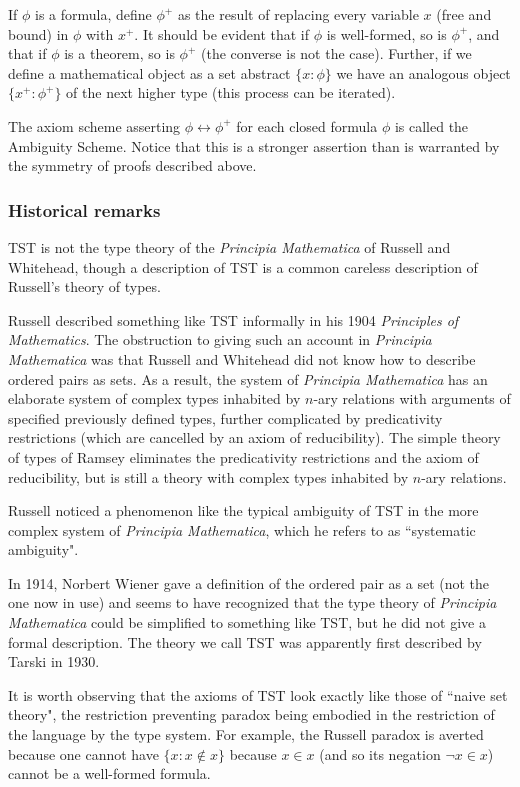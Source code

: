 \documentclass[12pt]{article}
\begin{document}
If $\phi$ is a formula, define $\phi^+$ as the result of replacing every variable $x$ (free and bound) in $\phi$ with $x^+$.  It should be evident that if $\phi$ is well-formed, so is $\phi^+$,
and that if $\phi$ is a theorem, so is $\phi^+$ (the converse is not the case).  Further, if we define a mathematical object as a set abstract $\{x:\phi\}$ we have an analogous
object $\{x^+:\phi^+\}$ of the next higher type (this process can be iterated).

The axiom scheme asserting $\phi \leftrightarrow \phi^+$ for each closed formula $\phi$ is called the Ambiguity Scheme.   Notice that this is a stronger assertion than is warranted by the symmetry of proofs described above.

\subsubsection{Historical remarks}

TST is not the type theory of the {\em Principia Mathematica\/} of Russell and Whitehead, though a description of TST is a common careless description of Russell's theory of types.

Russell described something like TST informally in his 1904 {\em Principles of Mathematics\/}.  The obstruction to giving such an account in {\em Principia Mathematica\/} was that
Russell and Whitehead did not know how to describe ordered pairs as sets.  As a result, the system of {\em Principia Mathematica\/} has an elaborate system of  complex
types inhabited by $n$-ary relations with arguments of specified previously defined types, further complicated by predicativity restrictions (which are cancelled by an axiom of reducibility).
The simple theory of types of Ramsey eliminates the predicativity restrictions and the axiom of reducibility, but is still a theory with complex types inhabited by $n$-ary relations.

Russell noticed a phenomenon like the typical ambiguity of TST in the more complex system of {\em Principia Mathematica\/}, which he refers to as ``systematic ambiguity".

In 1914, Norbert Wiener gave a definition of the ordered pair as a set (not the one now in use) and seems to have recognized that the type theory of {\em Principia Mathematica\/} could be simplified to something like TST, but he did not give a formal description.  The theory we call TST was apparently first described by Tarski in 1930.

It is worth observing that the axioms of TST look exactly like those of ``naive set theory", the restriction preventing paradox being embodied in the restriction of the language by the type system.
For example, the Russell paradox is averted because one cannot have $\{x:x \not\in x\}$ because $x \in x$ (and so its negation $\neg x \in x$) cannot be a well-formed formula.
\end{document}
